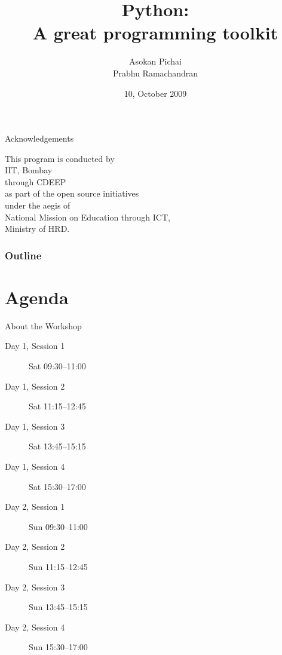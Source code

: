 \documentclass[14pt,compress]{beamer}
\title[Basic Python]{Python:\\A great programming toolkit}
\author[Asokan \& Prabhu] {Asokan Pichai\\Prabhu Ramachandran}
\institute[IIT Bombay] {Department of Aerospace Engineering\\IIT Bombay}
\date[] {10, October 2009}
\begin{document}
\begin{frame}
  \titlepage
\end{frame}
\begin{frame}
  {Acknowledgements}
  \begin{center}
  This program is conducted by\\
  IIT, Bombay\\
  through CDEEP\\as part of  the open source initiatives\\
  under the aegis of\\
  \alert{National Mission on Education through ICT,} \\
  Ministry of HRD.
  \end{center}
\end{frame}

\begin{frame}
  \frametitle{Outline}
  \tableofcontents
\end{frame}

%

\section{Agenda}
\begin{frame}{About the Workshop}
  \begin{description}
	\item[Day 1, Session 1] Sat 09:30--11:00
	\item[Day 1, Session 2] Sat 11:15--12:45
	\item[Day 1, Session 3] Sat 13:45--15:15
	\item[Day 1, Session 4] Sat 15:30--17:00
        \item[Day 2, Session 1] Sun 09:30--11:00
	\item[Day 2, Session 2] Sun 11:15--12:45
	\item[Day 2, Session 3] Sun 13:45--15:15
	\item[Day 2, Session 4] Sun 15:30--17:00
  \end{description}
\end{frame}
\end{document}
